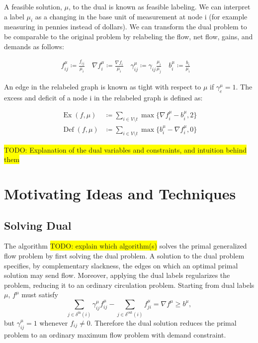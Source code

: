 \documentclass[11pt]{article}
\theoremstyle{definition}
\theoremstyle{definition}
\newcommand{\fu}{f^{\mu}}
\newcommand{\nfiu}{\nabla \fu_i}
\newcommand{\biu}{b_{i}^{\mu}}
\newcommand{\giij}{\gamma_{ij}^{\mu}}
\newcommand{\din}{\delta^{\text{in}}}
\newcommand{\dout}{\delta^{\text{out}}}
\DeclareMathOperator{\Ex}{Ex}
\DeclareMathOperator{\Def}{Def}
\newcommand{\todo}[1]{\colorbox{yellow}{TODO: #1}}
\begin{document}
A feasible solution, $\mu$, to the dual is known as feasible labeling. We can interpret a label $\mu_i$ as a changing in the base unit of measurement  at node i (for example measuring in pennies instead of dollars). We can transform the dual problem to be comparable to the original problem by relabeling the flow, net flow, gains, and demands as follows:

\begin{align*}
f_{ij}^\mu \coloneqq \frac{f_{ij}}{\mu_i} \quad
\nabla f_i^\mu \coloneqq \frac{\nabla f_i }{\mu_i} \quad
\gamma_{ij}^\mu \coloneqq \gamma_{ij} \frac{\mu_i}{\mu_j} \quad
b_i^\mu \coloneqq \frac{b_i}{\mu_i} \quad
\end{align*}

An edge in the relabeled graph is known as tight with respect to $\mu$ if $\gamma_e^\mu =1$. The excess and deficit of a node i in the relabeled graph is defined as:


\begin{align*}
\Ex(f,\mu)  &\coloneqq \sum_{i \in V \setminus t} \max \{ \nfiu - \biu, 2 \} \\
\Def(f,\mu) &\coloneqq \sum_{i \in V \setminus t} \max \{ \biu - \nfiu, 0 \}
\end{align*}

\todo{Explanation of the dual variables and constraints, and intuition behind them}
  
\section{Motivating Ideas and Techniques}
	\subsection{Solving Dual}
            
	The algorithm \todo{explain which algorithm(s)} solves the primal generalized flow problem by first solving the dual problem.
    A solution to the dual problem specifies, by complementary slackness, the edges on which an optimal
    primal solution may send flow. Moreover, applying the dual labels regularizes the problem, reducing
    it to an ordinary circulation problem. Starting from dual labels $\mu$, $f^{\mu}$ must satisfy
    \[ \sum_{j \in \din(i)} \giij \fu_{ij} - \sum_{j \in \dout(i)} \fu_{ji}
     = \nabla f^{\mu} \geq b^{\mu}, \]
    but $\giij = 1$ whenever $f_{ij} \neq 0$. Therefore the dual solution reduces the primal problem
    to an ordinary maximum flow problem with demand constraint.
    
\end{document}
